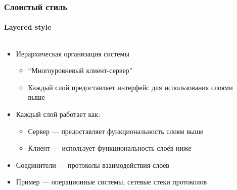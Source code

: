 \documentclass[xetex,mathserif,serif]{beamer}
\begin{document}
	\begin{frame}
		\frametitle{Слоистый стиль}
		\framesubtitle{Layered style}
		\begin{columns}
			\begin{column}{0.85\textwidth}
				\begin{itemize}
					\item Иерархическая организация системы
					\begin{itemize}
						\item ``Многоуровневый клиент-сервер''
						\item Каждый слой предоставляет интерфейс для использования слоями выше
					\end{itemize}
					\item Каждый слой работает как:
					\begin{itemize}
						\item Сервер --- предоставляет функциональность слоям выше
						\item Клиент --- использует функциональность слоёв ниже
					\end{itemize}
					\item Соединители --- протоколы взаимодействия слоёв
					\item Пример --- операционные системы, сетевые стеки протоколов
				\end{itemize}
			\end{column}
			\begin{column}{0.19\textwidth}
				\begin{center}

\end{center}
\end{column}
\end{columns}
\end{frame}
\end{document}
